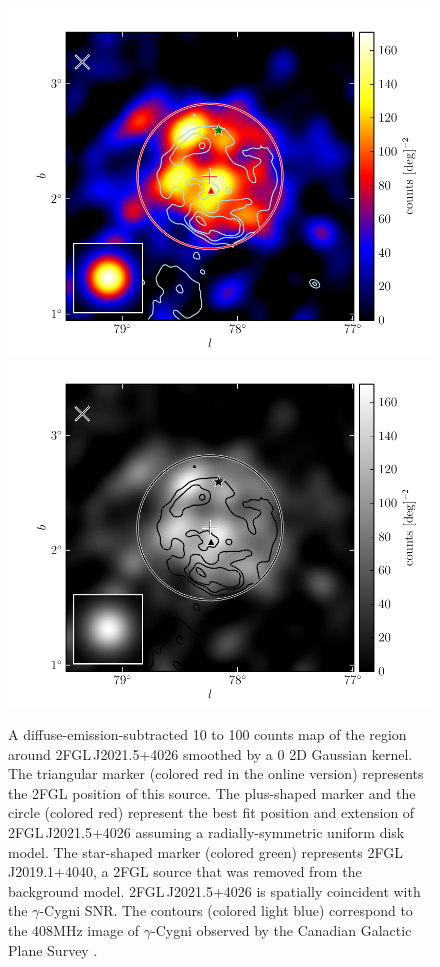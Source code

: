\begin{figure}[htbp]
    \ifcolorfigure
      \includegraphics{source_plots/source_Gamma_Cygni_color.pdf}
    \else
      \includegraphics{source_plots/source_Gamma_Cygni_bw.pdf}
    \fi
  \caption{A diffuse-emission-subtracted 
  10 \gev to 100 \gev counts map of the
  region around 2FGL\,J2021.5+4026 smoothed by a 0 2D Gaussian
  kernel. The triangular marker (colored red in the online version)
  represents the 2FGL position of this source.  The plus-shaped
  marker and the circle (colored red) represent the best fit position
  and extension of 2FGL\,J2021.5+4026 assuming a radially-symmetric
  uniform disk model.  
  The star-shaped marker (colored green)
  represents 2FGL\,J2019.1+4040,
  a 2FGL source that was removed from the background model.
  2FGL\,J2021.5+4026
  is spatially coincident with the $\gamma$-Cygni SNR.  The contours
  (colored light blue) correspond to the 408MHz image of $\gamma$-Cygni
  observed by the Canadian Galactic Plane Survey \citep{taylor_2003a_canadian-galactic}.
  }
\end{figure}



